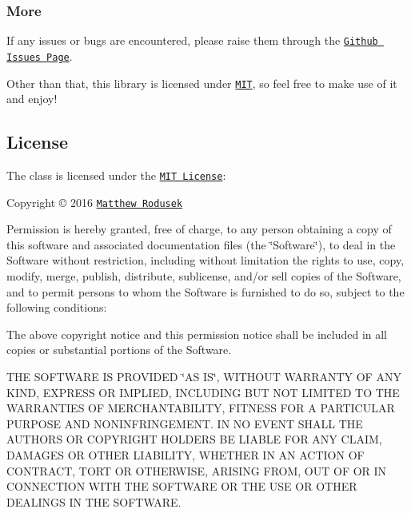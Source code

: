 \subsubsection*{More}

If any issues or bugs are encountered, please raise them through the \href{https://github.com/bitwizeshift/Lazy/issues}{\tt Github Issues Page}.

Other than that, this library is licensed under \href{#S-license}{\tt M\+IT}, so feel free to make use of it and enjoy!

\subsection*{\label{_S-license}%
 License}



The class is licensed under the \href{http://opensource.org/licenses/MIT}{\tt M\+IT License}\+:

Copyright \copyright{} 2016 \href{http://rodusek.me/}{\tt Matthew Rodusek}

Permission is hereby granted, free of charge, to any person obtaining a copy of this software and associated documentation files (the \char`\"{}\+Software\char`\"{}), to deal in the Software without restriction, including without limitation the rights to use, copy, modify, merge, publish, distribute, sublicense, and/or sell copies of the Software, and to permit persons to whom the Software is furnished to do so, subject to the following conditions\+:

The above copyright notice and this permission notice shall be included in all copies or substantial portions of the Software.

T\+HE S\+O\+F\+T\+W\+A\+RE IS P\+R\+O\+V\+I\+D\+ED \char`\"{}\+A\+S I\+S\char`\"{}, W\+I\+T\+H\+O\+UT W\+A\+R\+R\+A\+N\+TY OF A\+NY K\+I\+ND, E\+X\+P\+R\+E\+SS OR I\+M\+P\+L\+I\+ED, I\+N\+C\+L\+U\+D\+I\+NG B\+UT N\+OT L\+I\+M\+I\+T\+ED TO T\+HE W\+A\+R\+R\+A\+N\+T\+I\+ES OF M\+E\+R\+C\+H\+A\+N\+T\+A\+B\+I\+L\+I\+TY, F\+I\+T\+N\+E\+SS F\+OR A P\+A\+R\+T\+I\+C\+U\+L\+AR P\+U\+R\+P\+O\+SE A\+ND N\+O\+N\+I\+N\+F\+R\+I\+N\+G\+E\+M\+E\+NT. IN NO E\+V\+E\+NT S\+H\+A\+LL T\+HE A\+U\+T\+H\+O\+RS OR C\+O\+P\+Y\+R\+I\+G\+HT H\+O\+L\+D\+E\+RS BE L\+I\+A\+B\+LE F\+OR A\+NY C\+L\+A\+IM, D\+A\+M\+A\+G\+ES OR O\+T\+H\+ER L\+I\+A\+B\+I\+L\+I\+TY, W\+H\+E\+T\+H\+ER IN AN A\+C\+T\+I\+ON OF C\+O\+N\+T\+R\+A\+CT, T\+O\+RT OR O\+T\+H\+E\+R\+W\+I\+SE, A\+R\+I\+S\+I\+NG F\+R\+OM, O\+UT OF OR IN C\+O\+N\+N\+E\+C\+T\+I\+ON W\+I\+TH T\+HE S\+O\+F\+T\+W\+A\+RE OR T\+HE U\+SE OR O\+T\+H\+ER D\+E\+A\+L\+I\+N\+GS IN T\+HE S\+O\+F\+T\+W\+A\+RE. 
